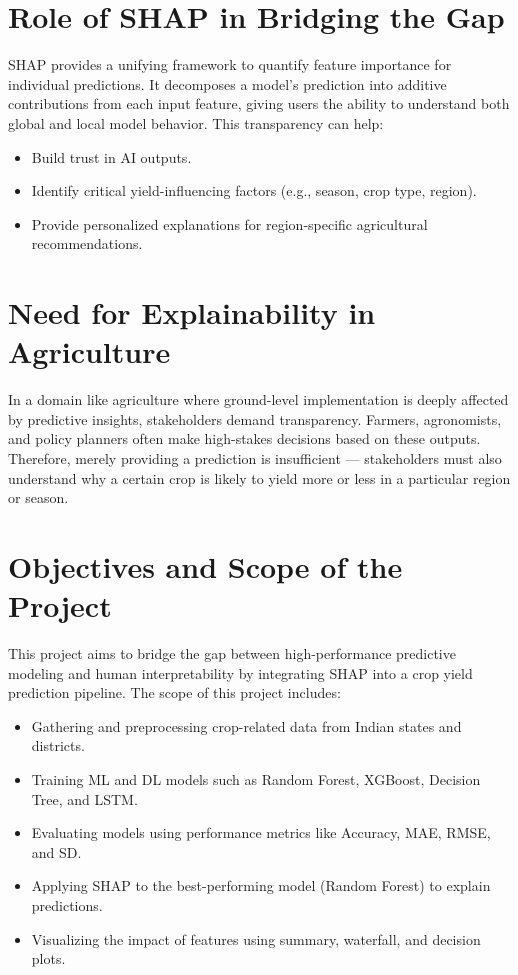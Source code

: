 \documentclass[a4paper,11pt,oneside]{book}
\begin{document}
\section{Role of SHAP in Bridging the Gap}

SHAP provides a unifying framework to quantify feature importance for individual predictions. It decomposes a model’s prediction into additive contributions from each input feature, giving users the ability to understand both global and local model behavior. This transparency can help:

\begin{itemize}
    \item Build trust in AI outputs.
    \item Identify critical yield-influencing factors (e.g., season, crop type, region).
    \item Provide personalized explanations for region-specific agricultural recommendations.
\end{itemize}

\section{Need for Explainability in Agriculture}

In a domain like agriculture where ground-level implementation is deeply affected by predictive insights, stakeholders demand transparency. Farmers, agronomists, and policy planners often make high-stakes decisions based on these outputs. Therefore, merely providing a prediction is insufficient — stakeholders must also understand why a certain crop is likely to yield more or less in a particular region or season.

\section{Objectives and Scope of the Project}

This project aims to bridge the gap between high-performance predictive modeling and human interpretability by integrating SHAP into a crop yield prediction pipeline. The scope of this project includes:

\begin{itemize}
    \item Gathering and preprocessing crop-related data from Indian states and districts.
    \item Training ML and DL models such as Random Forest, XGBoost, Decision Tree, and LSTM.
    \item Evaluating models using performance metrics like Accuracy, MAE, RMSE, and SD.
    \item Applying SHAP to the best-performing model (Random Forest) to explain predictions.
    \item Visualizing the impact of features using summary, waterfall, and decision plots.
\end{itemize}
\end{document}

